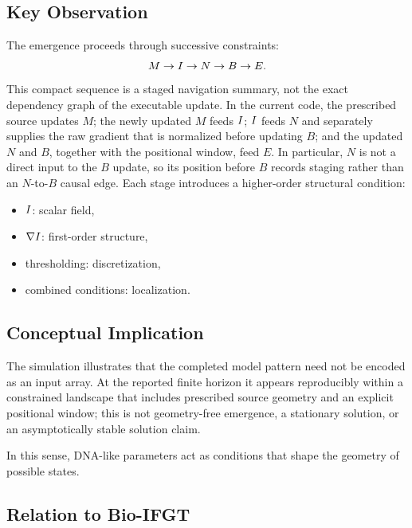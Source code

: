 \subsection{Key Observation}

The emergence proceeds through successive constraints:
\begin{equation}
  M \rightarrow I \rightarrow N \rightarrow B \rightarrow E.
\end{equation}
This compact sequence is a staged navigation summary, not the exact dependency graph of the executable update. In the current code, the prescribed source updates \(M\); the newly updated \(M\) feeds \(I\); \(I\) feeds \(N\) and separately supplies the raw gradient that is normalized before updating \(B\); and the updated \(N\) and \(B\), together with the positional window, feed \(E\). In particular, \(N\) is not a direct input to the \(B\) update, so its position before \(B\) records staging rather than an \(N\)-to-\(B\) causal edge.
Each stage introduces a higher-order structural condition:
\begin{itemize}
  \item \(I\): scalar field,
  \item \(\nabla I\): first-order structure,
  \item thresholding: discretization,
  \item combined conditions: localization.
\end{itemize}

\subsection{Conceptual Implication}

The simulation illustrates that the completed model pattern need not be encoded as an input array. At the reported finite horizon it appears reproducibly within a constrained landscape that includes prescribed source geometry and an explicit positional window; this is not geometry-free emergence, a stationary solution, or an asymptotically stable solution claim.

In this sense, DNA-like parameters act as conditions that shape the geometry of possible states.

\subsection{Relation to Bio-IFGT}

